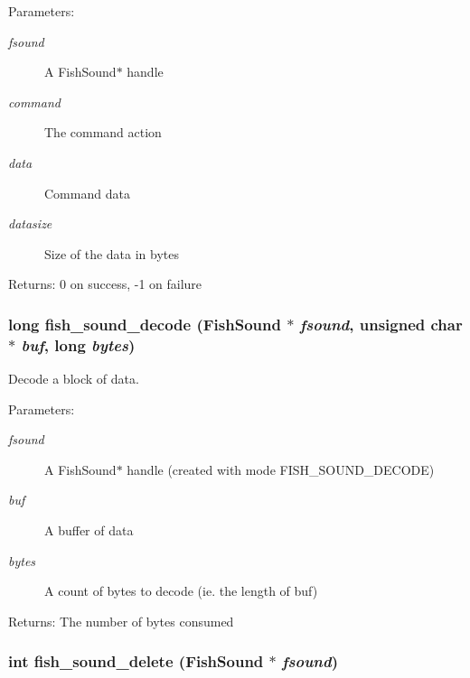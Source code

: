 \begin{Desc}
\item[Parameters:]
\begin{description}
\item[{\em fsound}]A Fish\-Sound$\ast$ handle \item[{\em command}]The command action \item[{\em data}]Command data \item[{\em datasize}]Size of the data in bytes \end{description}
\end{Desc}
\begin{Desc}
\item[Returns:]0 on success, -1 on failure \end{Desc}
\subsubsection{\setlength{\rightskip}{0pt plus 5cm}long fish\_\-sound\_\-decode ({\bf Fish\-Sound} $\ast$ {\em fsound}, unsigned char $\ast$ {\em buf}, long {\em bytes})}\label{fishsound_8h_a7}


Decode a block of data. 

\begin{Desc}
\item[Parameters:]
\begin{description}
\item[{\em fsound}]A Fish\-Sound$\ast$ handle (created with mode FISH\_\-SOUND\_\-DECODE) \item[{\em buf}]A buffer of data \item[{\em bytes}]A count of bytes to decode (ie. the length of buf) \end{description}
\end{Desc}
\begin{Desc}
\item[Returns:]The number of bytes consumed \end{Desc}
\subsubsection{\setlength{\rightskip}{0pt plus 5cm}int fish\_\-sound\_\-delete ({\bf Fish\-Sound} $\ast$ {\em fsound})}\label{fishsound_8h_a11}


